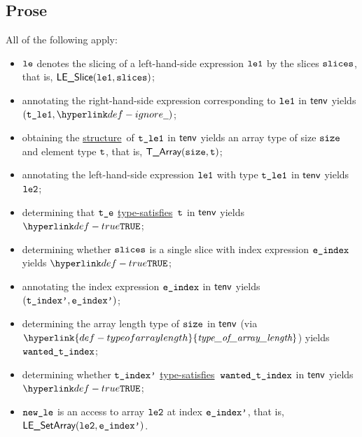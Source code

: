 \documentclass{book}
\newcommand\ProseOrTypeError[0]{\ProseTerminateAs{\TypeErrorConfig}}
\newcommand\structure[0]{\hyperlink{def-structure}{structure}}
\newcommand\typesatisfies[0]{\hyperlink{def-typesatisfies}{type-satisfies}}
\newcommand\typeofarraylength[0]{\hyperlink{def-typeofarraylength}{\textfunc{type\_of\_array\_length}}}
\begin{document}
\subsection{Prose}
All of the following apply:
\begin{itemize}
  \item $\texttt{le}$ denotes the slicing of a left-hand-side expression $\texttt{le1}$ by the slices $\texttt{slices}$, that is, $\textsf{LE\_Slice}(\texttt{le1}, \texttt{slices})$;
  \item annotating the right-hand-side expression corresponding to $\texttt{le1}$ in $\textsf{tenv}$ yields \\ $(\vtleone, \Ignore)$\ProseOrTypeError;
  \item obtaining the \structure\ of $\texttt{t\_le1}$ in $\textsf{tenv}$ yields an array type of size $\texttt{size}$ and element type $\texttt{t}$, that is, $\textsf{T\_Array}(\texttt{size}, \texttt{t})$\ProseOrTypeError;
  \item annotating the left-hand-side expression $\texttt{le1}$ with type $\texttt{t\_le1}$ in $\textsf{tenv}$ yields $\texttt{le2}$\ProseOrTypeError;
  \item determining that $\texttt{t\_e}$ \typesatisfies\ $\texttt{t}$ in $\textsf{tenv}$ yields $\True$\ProseOrTypeError;
  \item determining whether $\texttt{slices}$ is a single slice with index expression $\texttt{e\_index}$ yields $\True$\ProseOrTypeError;
  \item annotating the index expression $\texttt{e\_index}$ in $\textsf{tenv}$ yields $(\texttt{t\_index'}, \texttt{e\_index'})$\ProseOrTypeError;
  \item determining the array length type of $\texttt{size}$ in $\textsf{tenv}$ (via $\typeofarraylength$) yields $\texttt{wanted\_t\_index}$;
  \item determining whether $\texttt{t\_index'}$ \typesatisfies\ $\texttt{wanted\_t\_index}$ in $\textsf{tenv}$ yields \\
        $\True$\ProseOrTypeError;
  \item $\texttt{new\_le}$ is an access to array $\texttt{le2}$ at index $\texttt{e\_index'}$, that is, \\ $\textsf{LE\_SetArray}(\texttt{le2}, \texttt{e\_index'})$.
\end{itemize}


\end{document}
